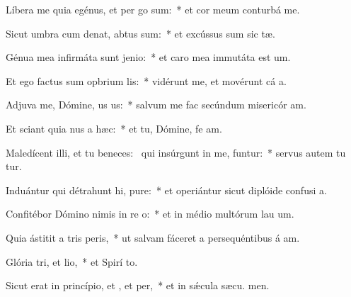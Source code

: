\item Líbera me quia egénus, et per go sum:~* et cor meum conturbá   me.
\item Sicut umbra cum denat, abtus sum:~* et excússus sum sic tæ.
\item Génua mea infirmáta sunt  jenio:~* et caro mea immutáta est  um.
\item Et ego factus sum opbrium lis:~* vidérunt me, et movérunt cá a.
\item Adjuva me, Dómine, us us:~* salvum me fac secúndum misericór am.
\item Et sciant quia nus a hæc:~* et tu, Dómine, fe am.
\item Maledícent illi, et tu beneces:~\pscross{} qui insúrgunt in me, funtur:~* servus autem tu tur.
\item Induántur qui détrahunt hi, pure:~* et operiántur sicut diplóide confusi a.
\item Confitébor Dómino nimis in re o:~* et in médio multórum lau um.
\item Quia ástitit a tris peris,~* ut salvam fáceret a persequéntibus á am.
\item Glória tri, et lio,~* et Spirí to.
\item Sicut erat in princípio, et , et per,~* et in sǽcula sæcu. men.
